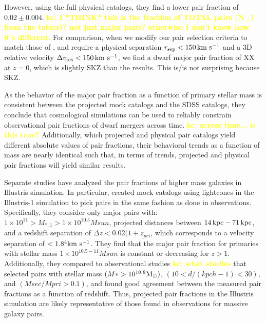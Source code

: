 \documentclass[twocolumn]{aastex631}
\newcommand{\kc}[1]{\textcolor{yellow}{\textbf{kc: #1}} }
\begin{document}
However, using the full physical catalogs, they find a lower pair fraction of $0.02\pm0.004$. \kc{I *THINK* this is the fraction of TOTAL pairs (N\_1 from the tables)? not just major pairs? otherwise I don't know how it's different.}
For comparison, when we modify our pair selection criteria to match those of \citet{Besla2018}, and require a physical separation $r_{\rm sep}< 150\,\mathrm{km}~\mathrm{s}^{-1}$ and a 3D relative velocity $\Delta v_{\rm los} < 150\,\mathrm{km}~\mathrm{s}^{-1}$, we find a dwarf major pair fraction of XX at $z=0$, which is slightly SKZ than the \citet{Besla2018} results.
This is/is not surprising because SKZ. 

As the behavior of the major pair fraction as a function of primary stellar mass is consistent between the projected mock catalogs and the SDSS catalogs, they conclude that cosmological simulations can be used to reliably constrain observational pair fractions of dwarf mergers across time. \kc{across time... is this true?} 
Additionally, which projected and physical pair catalogs yield different absolute values of pair fractions, their behavioral trends as a function of mass are nearly identical such that, in terms of trends, projected and physical pair fractions will yield similar results. 



Separate studies have analyzed the pair fractions of higher mass galaxies in Illustris simulation. 
In particular, \citet{snyder2017} created mock catalogs using lightcones in the Illustris-1 simulation to pick pairs in the same fashion as done in observations. 
Specifically, they consider only major pairs with: $1\times 10^{11}>M_{*,1} >1\times 10^{10.5}Msun$, projected distances between $14\mathrm{\,kpc}-71\mathrm{\,kpc}$, and a redshift separation of $\Delta z<0.02(1+z_{pri}$, which corresponds to a velocity separation of $<1.8\time10^4\kms$. 
They find that the major pair fraction for primaries with stellar mass $1\times 10^{10.5-11}Msun$ is constant or decreasing for $z>1$. 
Additionally, they compared to observational studies \kc{what studies} that selected pairs with stellar mass $(M* > 10^{10.8}\mathrm{M}_\odot)$, $(10 <d/(kpc h-1) < 30)$, and $(Msec/Mpri > 0.1)$, and found good agreement between the measured pair fractions as a function of redshift.
Thus, projected pair fractions in the Illustris simulation are likely representative of those found in observations for massive galaxy pairs.
\end{document}
